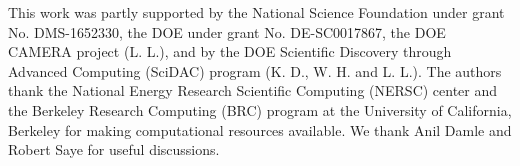 This work was partly supported by the National Science Foundation under grant
No. DMS-1652330, the DOE under grant No. DE-SC0017867, the DOE CAMERA project 
(L. L.), and by the DOE Scientific Discovery through Advanced Computing (SciDAC)
program (K. D., W.  H. and L. L.). The authors thank the National Energy
Research Scientific Computing (NERSC) center and the Berkeley Research Computing
(BRC) program at the University of California, Berkeley for making computational
resources available. We thank Anil Damle and Robert Saye for useful discussions.